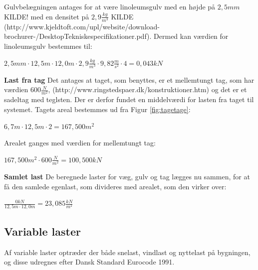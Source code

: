 Gulvbelægningen antages for at være linoleumsgulv med en højde på $2,\!5 mm$ KILDE! med en densitet på $2,\!9 \frac{kg}{m^3}$ KILDE (http://www.kjeldtoft.com/upl/website/download-brochurer-/DesktopTekniskespecifikationer.pdf). Dermed kan værdien for linoleumsgulv bestemmes til:
\begin{center}
	$2,\!5 mm\cdot 12,\!5 m\cdot 12,\!0 m\cdot 2,\!9 \frac{kg}{m^3}\cdot 9,\!82 \frac{m}{s^2}\cdot 4=0,\!043 kN$
\end{center}

\textbf{Last fra tag}
\newline
Det antages at taget, som benyttes, er et mellemtungt tag, som har værdien $600 \frac{N}{m^2}$, (http://www.ringstedspaer.dk/konstruktioner.htm) og det er et sadeltag med teglsten. Der er derfor fundet en middelværdi for lasten fra taget til systemet. 
\newline
\newline
Tagets areal bestemmes ud fra Figur \ref{fig:tagetage}:
\begin{center}
	$6,\!7 m\cdot 12,\!5 m \cdot 2=167,\!500 m^2$
\end{center}

Arealet ganges med værdien for mellemtungt tag:
\begin{center}
	$167,\!500 m^2\cdot 600 \frac{N}{m^2}=100,\!500 kN$
\end{center}

\textbf{Samlet last}
\newline
De beregnede laster for væg, gulv og tag lægges nu sammen, for at få den samlede egenlast, som divideres med arealet, som den virker over:
\begin{center}
	$\frac{0 kN}{12,\!5 m\cdot 12,\!0 m}=23,\!085 \frac{kN}{m^2}$
\end{center}


\subsection{Variable laster}
Af variable laster optræder der både snelast, vindlast og nyttelast på bygningen, og disse udregnes efter Dansk Standard Eurocode 1991.

